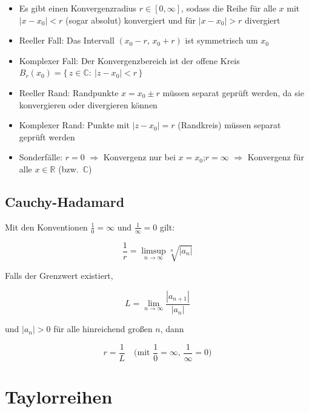 \documentclass[a4paper,11pt,oneside,open=any,parskip=half, DIV=15]{scrreprt}
\begin{document}
      \begin{itemize}
         \item Es gibt einen Konvergenzradius \(r\in[0,\infty]\), sodass die Reihe für alle \(x\) mit \(|x-x_0|<r\) (sogar absolut) konvergiert und für \(|x-x_0|>r\) divergiert
         \item Reeller Fall: Das Intervall \((x_0-r,\,x_0+r)\) ist symmetrisch um \(x_0\)
         \item Komplexer Fall: Der Konvergenzbereich ist der offene Kreis \(B_r(x_0)=\{\,z\in\mathbb{C}:\ |z-x_0|<r\,\}\)
         \item Reeller Rand: Randpunkte \(x=x_0\pm r\) müssen separat geprüft werden, da sie konvergieren oder divergieren können
         \item Komplexer Rand: Punkte mit \(|z-x_0|=r\) (Randkreis) müssen separat geprüft werden
         \item Sonderfälle: \(r=0\) \(\Rightarrow\) Konvergenz nur bei \(x=x_0\);\quad \(r=\infty\) \(\Rightarrow\) Konvergenz für alle \(x\in\mathbb{R}\) (bzw.\ \(\mathbb{C}\))
      \end{itemize}

   \subsection*{Cauchy-Hadamard}

   Mit den Konventionen \(\frac{1}{0}=\infty\) und \(\frac{1}{\infty}=0\) gilt:
   \begin{importantbox}
      \[
         \frac{1}{r}=\limsup_{n\to\infty}\sqrt[n]{|a_n|}
      \]
   \end{importantbox}

   Falls der Grenzwert existiert,
   \begin{importantbox}
      \[
         L=\lim_{n\to\infty}\frac{|a_{n+1}|}{|a_n|}
      \]
   \end{importantbox}
   und \(|a_n|>0\) für alle hinreichend großen \(n\), dann
   \begin{importantbox}
      \[
         r=\frac{1}{L}
         \quad\text{(mit \(\frac{1}{0}=\infty\), \(\frac{1}{\infty}=0\))}
      \]
   \end{importantbox}

\section{Taylorreihen}
\end{document}
